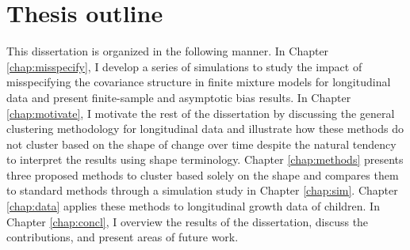 \section{Thesis outline}
This dissertation is organized in the following manner. In Chapter \ref{chap:misspecify}, I develop a series of simulations to study the impact of misspecifying the covariance structure in finite mixture models for longitudinal data and present finite-sample and asymptotic bias results. In Chapter \ref{chap:motivate}, I motivate the rest of the dissertation by discussing the general clustering methodology for longitudinal data and illustrate how these methods do not cluster based on the shape of change over time despite the natural tendency to interpret the results using shape terminology. Chapter \ref{chap:methods} presents three proposed methods to cluster based solely on the shape and compares them to standard methods through a simulation study in Chapter \ref{chap:sim}. Chapter \ref{chap:data} applies these methods to longitudinal growth data of children. In Chapter \ref{chap:concl}, I overview the results of the dissertation, discuss the contributions, and present areas of future work. 